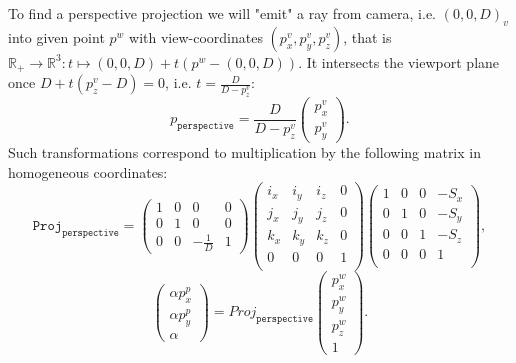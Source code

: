 \documentclass[a4paper]{article}
\begin{document}
To find a perspective projection we will "emit"
a ray from camera, i.e. \( (0,0,D)_v \)
into given point \( p^w \) with view-coordinates
\( (p_x^v,p_y^v,p_z^v) \),
that is \( \mathbb{R}_+\to\mathbb{R}^3:t\mapsto (0,0,D) + t (p^w - (0,0,D)) \).
It intersects the viewport plane once \( D + t(p_z^v-D) = 0 \),
i.e. \( t = \frac{D}{D-p_z^v} \):
\[ p_\mathtt{perspective} = \frac{D}{D-p_z^v}\begin{pmatrix} p_x^v \\ p_y^v \end{pmatrix}. \]
Such transformations correspond to multiplication
by the following matrix in homogeneous coordinates:
\[
    \mathtt{Proj}_\mathtt{perspective} =
    \begin{pmatrix}
        1 & 0 & 0 & 0 \\
        0 & 1 & 0 & 0 \\
        0 & 0 & -\frac1D & 1
    \end{pmatrix}
    \begin{pmatrix}
        i_x & i_y & i_z & 0 \\
        j_x & j_y & j_z & 0 \\
        k_x & k_y & k_z & 0 \\
        0   & 0   & 0   & 1 \\
    \end{pmatrix}
    \begin{pmatrix}
        1 & 0 & 0 & -S_x \\
        0 & 1 & 0 & -S_y \\
        0 & 0 & 1 & -S_z \\
        0 & 0 & 0 & 1 \\
    \end{pmatrix}, \]
\[
    \begin{pmatrix} \alpha p_x^p \\ \alpha p_y^p \\ \alpha \end{pmatrix} =
        \mathit{Proj}_\mathtt{perspective}
        \begin{pmatrix} p_x^w \\ p_y^w \\ p_z^w \\ 1 \end{pmatrix}. \]
\end{document}
